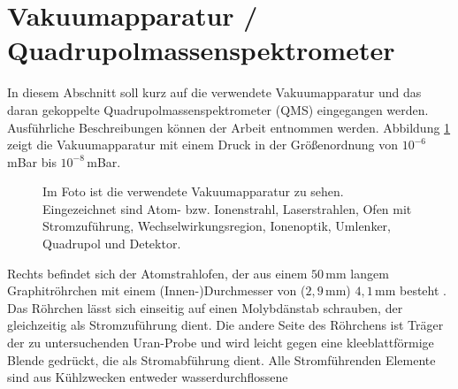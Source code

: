 \section{Vakuumapparatur /
Quadrupolmassenspektrometer}\label{sec:vakuumapparatur_qms}
In diesem Abschnitt soll kurz auf die verwendete Vakuumapparatur und das daran
gekoppelte Quadrupolmassenspektrometer (QMS) eingegangen werden. Ausführliche
Beschreibungen können der Arbeit \cite{blaum:1997:diplomarbeit} entnommen
werden. Abbildung \ref{fig:vakuumapparatur_foto} zeigt die Vakuumapparatur mit
einem Druck in der Größenordnung von $10^{-6}\,$mBar bis $10^{-8}\,$mBar.\par
\begin{figure}[h]
 	\centering
	\caption[Vakuumapparatur]{Im Foto ist die verwendete Vakuumapparatur zu sehen.
	Eingezeichnet sind Atom- bzw. Ionenstrahl, Laserstrahlen,
	Ofen mit Stromzuführung, Wechselwirkungsregion, Ionenoptik, Umlenker,
	Quadrupol und Detektor.}\label{fig:vakuumapparatur_foto}
\end{figure}
Rechts befindet sich der Atomstrahlofen, der aus einem $50\,$mm langem
Graphitröhrchen mit einem (Innen-)Durchmesser von ($2,9\,$mm) $4,1\,$mm besteht \cite{raeder:2006:diplomarbeit}. Das Röhrchen lässt sich einseitig auf einen
Molybdänstab schrauben, der gleichzeitig als Stromzuführung dient. Die andere
Seite des Röhrchens ist Träger der zu untersuchenden Uran-Probe und wird leicht
gegen eine kleeblattförmige Blende gedrückt, die als Stromabführung dient. Alle
Stromführenden Elemente sind aus Kühlzwecken entweder wasserdurchflossene
